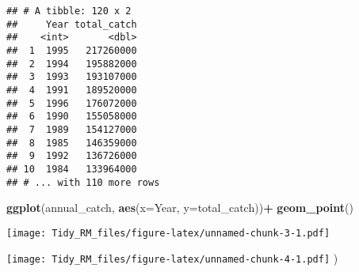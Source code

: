 \documentclass[]{article}
\newenvironment{Shaded}{\begin{snugshade}}{\end{snugshade}}
\newcommand{\DataTypeTok}[1]{\textcolor[rgb]{0.13,0.29,0.53}{#1}}
\newcommand{\KeywordTok}[1]{\textcolor[rgb]{0.13,0.29,0.53}{\textbf{#1}}}
\newcommand{\NormalTok}[1]{#1}
\newcommand{\OperatorTok}[1]{\textcolor[rgb]{0.81,0.36,0.00}{\textbf{#1}}}
\newcommand{\OtherTok}[1]{\textcolor[rgb]{0.56,0.35,0.01}{#1}}
\newcommand{\StringTok}[1]{\textcolor[rgb]{0.31,0.60,0.02}{#1}}
\begin{document}
\begin{verbatim}
## # A tibble: 120 x 2
##     Year total_catch
##    <int>       <dbl>
##  1  1995   217260000
##  2  1994   195882000
##  3  1993   193107000
##  4  1991   189520000
##  5  1996   176072000
##  6  1990   155058000
##  7  1989   154127000
##  8  1985   146359000
##  9  1992   136726000
## 10  1984   133964000
## # ... with 110 more rows
\end{verbatim}

\begin{Shaded}
\begin{Highlighting}[]
\KeywordTok{ggplot}\NormalTok{(annual_catch, }\KeywordTok{aes}\NormalTok{(}\DataTypeTok{x=}\NormalTok{Year, }\DataTypeTok{y=}\NormalTok{total_catch))}\OperatorTok{+}
\StringTok{  }\KeywordTok{geom_point}\NormalTok{()}
\end{Highlighting}
\end{Shaded}

\texttt{[image: Tidy\_RM\_files/figure-latex/unnamed-chunk-3-1.pdf]}

\begin{Shaded}
\end{Shaded}

\texttt{[image: Tidy\_RM\_files/figure-latex/unnamed-chunk-4-1.pdf]} )

\begin{Shaded}
\end{Shaded}
\end{document}

